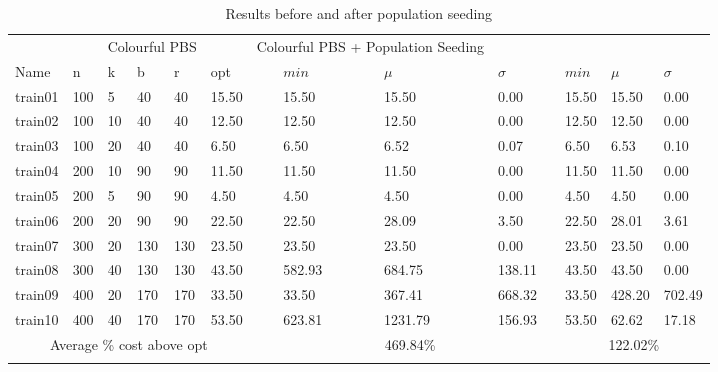 \begin{table}[H]
    \caption{Results before and after population seeding}\label{table:improved_colourful_pbs}
    \footnotesize
    \begin{tabularx}{\textwidth}{lllllllXXXlXXX}
    \firsthline
    \multicolumn{6}{c}{Instance} & \quad & \multicolumn{3}{c}{Colourful PBS} & \quad & \multicolumn{3}{c}{Colourful PBS + Population Seeding}\\
    \cline{1-6} \cline{8-10} \cline{12-14}
    Name & n & k & b & r & opt && $min$ &$\mu$ & $\sigma$ && $min$ &$\mu$ & $\sigma$\\
    \hline
    train01 & 100 & 5 & 40 & 40 & 15.50 && 15.50 & 15.50 & 0.00 && 15.50 & 15.50 & 0.00\\
    train02 & 100 & 10 & 40 & 40 & 12.50 && 12.50 & 12.50 & 0.00 && 12.50 & 12.50 & 0.00\\
    train03 & 100 & 20 & 40 & 40 & 6.50 && 6.50 & 6.52 & 0.07 && 6.50 & 6.53 & 0.10\\
    train04 & 200 & 10 & 90 & 90 & 11.50 && 11.50 & 11.50 & 0.00 && 11.50 & 11.50 & 0.00\\
    train05 & 200 & 5 & 90 & 90 & 4.50 && 4.50 & 4.50 & 0.00 && 4.50 & 4.50 & 0.00\\
    train06 & 200 & 20 & 90 & 90 & 22.50 && 22.50 & 28.09 & 3.50 && 22.50 & 28.01 & 3.61\\
    train07 & 300 & 20 & 130 & 130 & 23.50 && 23.50 & 23.50 & 0.00 && 23.50 & 23.50 & 0.00\\
    train08 & 300 & 40 & 130 & 130 & 43.50 && 582.93 & 684.75 & 138.11 && 43.50 & 43.50 & 0.00\\
    train09 & 400 & 20 & 170 & 170 & 33.50 && 33.50 & 367.41 & 668.32 && 33.50 & 428.20 & 702.49\\
    train10 & 400 & 40 & 170 & 170 & 53.50 && 623.81 & 1231.79 & 156.93 && 53.50 & 62.62 & 17.18\\
    \hline
    \multicolumn{6}{c}{Average \% cost above opt} && \multicolumn{3}{c}{469.84\%} && \multicolumn{3}{c}{122.02\%}\\
    \lasthline
    \end{tabularx}
    \normalsize
\end{table}
